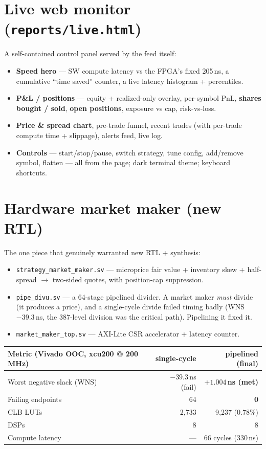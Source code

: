 \documentclass[10pt,a4paper]{article}
\newcommand{\code}[1]{\texttt{\small #1}}
\begin{document}
\section{Live web monitor (\code{reports/live.html})}
A self-contained control panel served by the feed itself:
\begin{itemize}[leftmargin=1.4em, itemsep=1pt]
  \item \textbf{Speed hero} — SW compute latency vs the FPGA's fixed 205\,ns, a
  cumulative ``time saved'' counter, a live latency histogram + percentiles.
  \item \textbf{P\&L / positions} — equity + realized-only overlay, per-symbol PnL,
  \textbf{shares bought / sold}, \textbf{open positions}, exposure vs cap, risk-vs-loss.
  \item \textbf{Price \& spread chart}, pre-trade funnel, recent trades (with per-trade
  compute time + slippage), alerts feed, live log.
  \item \textbf{Controls} — start/stop/pause, switch strategy, tune config, add/remove
  symbol, flatten — all from the page; dark terminal theme; keyboard shortcuts.
\end{itemize}

\section{Hardware market maker (new RTL)}
The one piece that genuinely warranted new RTL + synthesis:
\begin{itemize}[leftmargin=1.4em, itemsep=1pt]
  \item \code{strategy\_market\_maker.sv} — microprice fair value + inventory skew +
  half-spread $\to$ two-sided quotes, with position-cap suppression.
  \item \code{pipe\_divu.sv} — a 64-stage pipelined divider. A market maker \emph{must}
  divide (it produces a price), and a single-cycle divide failed timing badly
  (WNS $-39.3$\,ns, the 387-level division was the critical path). Pipelining it fixed it.
  \item \code{market\_maker\_top.sv} — AXI-Lite CSR accelerator + latency counter.
\end{itemize}

\begin{center}
\begin{tabular}{lrr}
\toprule
\textbf{Metric (Vivado OOC, xcu200 @ 200\,MHz)} & \textbf{single-cycle} & \textbf{pipelined (final)} \\
\midrule
Worst negative slack (WNS)  & $-39.3$\,ns (fail) & $\mathbf{+1.004}$\,\textbf{ns (met)} \\
Failing endpoints           & 64                 & \textbf{0} \\
CLB LUTs                    & 2{,}733            & 9{,}237 (0.78\%) \\
DSPs                        & 8                  & 8 \\
Compute latency             & ---                & 66 cycles (330\,ns) \\
\bottomrule
\end{tabular}
\end{center}
\end{document}
